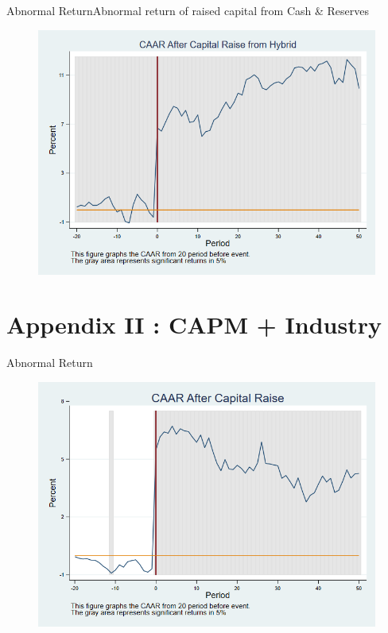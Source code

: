 \documentclass{beamer}
\begin{document}
\begin{frame}{Abnormal Return}{Abnormal return of raised capital from Cash \& Reserves}
	\label{car_withoutalphahybrid}
	\begin{figure}
		\centering
		\includegraphics[width=0.65\linewidth]{Output/car_withoutalphaHybrid}
		\label{fig:car_withoutalphahybrid3}
	\end{figure}

\end{frame}




\section{Appendix II : CAPM + Industry}

\begin{frame}{Abnormal Return}
	\label{car_industry}
	\begin{figure}
		\centering
		\includegraphics[width=0.7\linewidth]{Output/car_industry.png}
		\label{fig:car_industry}
	\end{figure}
\end{frame}
\end{document}
